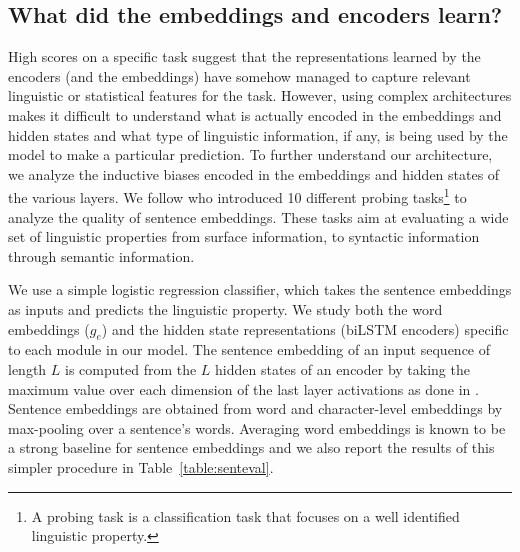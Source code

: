 \documentclass[letterpaper]{article} %
\begin{document}
\begin{table}
\centering
\caption{Ablation study on the embeddings. We remove one by one the embeddings on the first layer of the best performing model (A-RS-GM).}
\label{table:ablation_embeddings}
\end{table}



\subsection{What did the embeddings and encoders learn?}

High scores on a specific task suggest that the representations learned by the encoders (and the embeddings) have somehow managed to capture relevant linguistic or statistical features for the task. However, using complex architectures makes it difficult to understand what is actually encoded in the embeddings and hidden states and what type of linguistic information, if any, is being used by the model to make a particular prediction. To further understand our architecture, we analyze the inductive biases encoded in the embeddings and hidden states of the various layers. We follow \citeauthor{Conneau2018}  who introduced 10 different probing tasks\footnote{A probing task is a classification task that focuses on a well identified linguistic property.} to analyze the quality of sentence embeddings. These tasks aim at evaluating a wide set of linguistic properties from surface information, to syntactic information through semantic information.

We use a simple logistic regression classifier, which takes the sentence embeddings as inputs and predicts the linguistic property. We study both the word embeddings ($g_{e}$) and the hidden state representations (biLSTM encoders) specific to each module in our model. The sentence embedding of an input sequence of length $L$ is computed from the $L$ hidden states of an encoder by taking the maximum value over each dimension of the last layer activations as done in \cite{Conneau17}.
Sentence embeddings are obtained from word and character-level embeddings by max-pooling over a sentence's words. Averaging word embeddings is known to be a strong baseline for sentence embeddings \cite{Arora2017asimple} and we also report the results of this simpler procedure in Table~\ref{table:senteval}.
\end{document}
